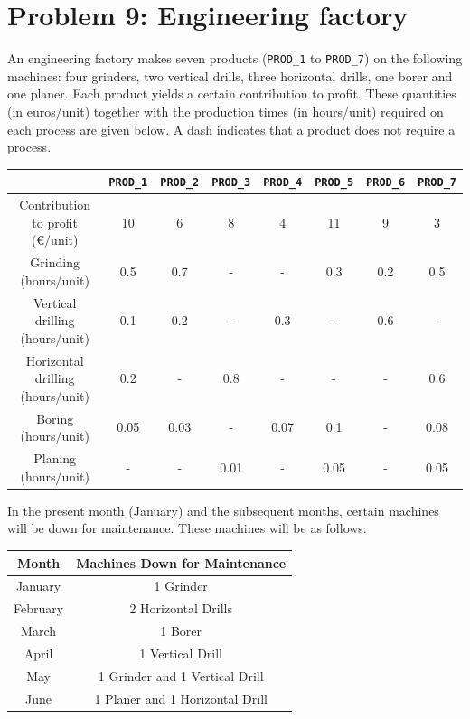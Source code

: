 \documentclass[a4paper,10pt]{article}
\begin{document}
\newpage

\section*{Problem 9: Engineering factory}

An engineering factory makes seven products (\texttt{PROD\_1} to \texttt{PROD\_7}) on the following machines:
four grinders, two vertical drills, three horizontal drills, one borer and one planer. Each product
yields a certain contribution to profit. These quantities (in euros/unit) together with the production
times (in hours/unit) required on each process are given below. A dash indicates that a product
does not require a process.

\begin{center}
\begin{tabular}{|c|c|c|c|c|c|c|c|}
\hline
& \texttt{PROD\_1} & \texttt{PROD\_2} & \texttt{PROD\_3} & \texttt{PROD\_4} & \texttt{PROD\_5} & \texttt{PROD\_6} & \texttt{PROD\_7} \\
\hline
Contribution to profit (\euro/unit) & 10 & 6 & 8 & 4 & 11 & 9 & 3 \\
\hline
Grinding (hours/unit) & 0.5 & 0.7 & - & - & 0.3 & 0.2 & 0.5 \\
\hline
Vertical drilling (hours/unit) & 0.1 & 0.2 & - & 0.3 & - & 0.6 & - \\
\hline
Horizontal drilling (hours/unit) & 0.2 & - & 0.8 & - & - & - & 0.6 \\
\hline
Boring (hours/unit) & 0.05 & 0.03 & - & 0.07 & 0.1 & - & 0.08 \\
\hline
Planing (hours/unit) & - & - & 0.01 & - & 0.05 & - & 0.05 \\
\hline
\end{tabular}
\end{center}

In the present month (January) and the subsequent months, certain machines will be down
for maintenance. These machines will be as follows:

\begin{center}
\begin{tabular}{|c|c|}
\hline
Month & Machines Down for Maintenance \\
\hline
January & 1 Grinder \\
\hline
February & 2 Horizontal Drills \\
\hline
March & 1 Borer \\
\hline
April & 1 Vertical Drill \\
\hline
May & 1 Grinder and 1 Vertical Drill \\
\hline
June & 1 Planer and 1 Horizontal Drill \\
\hline
\end{tabular}
\end{center}
\end{document}
